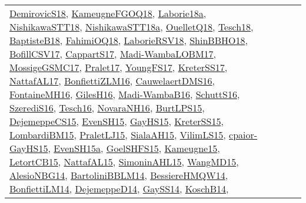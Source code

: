 {\begin{longtable}{lp{3cm}>{\raggedright}p{6cm}>{\raggedright}p{6cm}p{8cm}}
\href{papers/DemirovicS18.pdf}{DemirovicS18}\cite{DemirovicS18}, \href{papers/KameugneFGOQ18.pdf}{KameugneFGOQ18}\cite{KameugneFGOQ18}, \href{papers/Laborie18a.pdf}{Laborie18a}\cite{Laborie18a}, \href{papers/NishikawaSTT18.pdf}{NishikawaSTT18}\cite{NishikawaSTT18}, \href{papers/NishikawaSTT18a.pdf}{NishikawaSTT18a}\cite{NishikawaSTT18a}, \href{papers/OuelletQ18.pdf}{OuelletQ18}\cite{OuelletQ18}, \href{papers/Tesch18.pdf}{Tesch18}\cite{Tesch18}, \href{articles/BaptisteB18.pdf}{BaptisteB18}\cite{BaptisteB18}, \href{articles/FahimiOQ18.pdf}{FahimiOQ18}\cite{FahimiOQ18}, \href{articles/LaborieRSV18.pdf}{LaborieRSV18}\cite{LaborieRSV18}, \href{articles/ShinBBHO18.pdf}{ShinBBHO18}\cite{ShinBBHO18}, \href{papers/BofillCSV17.pdf}{BofillCSV17}\cite{BofillCSV17}, \href{papers/CappartS17.pdf}{CappartS17}\cite{CappartS17}, \href{papers/Madi-WambaLOBM17.pdf}{Madi-WambaLOBM17}\cite{Madi-WambaLOBM17}, \href{papers/MossigeGSMC17.pdf}{MossigeGSMC17}\cite{MossigeGSMC17}, \href{papers/Pralet17.pdf}{Pralet17}\cite{Pralet17}, \href{papers/YoungFS17.pdf}{YoungFS17}\cite{YoungFS17}, \href{articles/KreterSS17.pdf}{KreterSS17}\cite{KreterSS17}, \href{articles/NattafAL17.pdf}{NattafAL17}\cite{NattafAL17}, \href{papers/BonfiettiZLM16.pdf}{BonfiettiZLM16}\cite{BonfiettiZLM16}, \href{papers/CauwelaertDMS16.pdf}{CauwelaertDMS16}\cite{CauwelaertDMS16}, \href{papers/FontaineMH16.pdf}{FontaineMH16}\cite{FontaineMH16}, \href{papers/GilesH16.pdf}{GilesH16}\cite{GilesH16}, \href{papers/Madi-WambaB16.pdf}{Madi-WambaB16}\cite{Madi-WambaB16}, \href{papers/SchuttS16.pdf}{SchuttS16}\cite{SchuttS16}, \href{papers/SzerediS16.pdf}{SzerediS16}\cite{SzerediS16}, \href{papers/Tesch16.pdf}{Tesch16}\cite{Tesch16}, \href{articles/NovaraNH16.pdf}{NovaraNH16}\cite{NovaraNH16}, \href{papers/BurtLPS15.pdf}{BurtLPS15}\cite{BurtLPS15}, \href{papers/DejemeppeCS15.pdf}{DejemeppeCS15}\cite{DejemeppeCS15}, \href{papers/EvenSH15.pdf}{EvenSH15}\cite{EvenSH15}, \href{papers/GayHS15.pdf}{GayHS15}\cite{GayHS15}, \href{papers/KreterSS15.pdf}{KreterSS15}\cite{KreterSS15}, \href{papers/LombardiBM15.pdf}{LombardiBM15}\cite{LombardiBM15}, \href{papers/PraletLJ15.pdf}{PraletLJ15}\cite{PraletLJ15}, \href{papers/SialaAH15.pdf}{SialaAH15}\cite{SialaAH15}, \href{papers/VilimLS15.pdf}{VilimLS15}\cite{VilimLS15}, \href{papers/cpaior-GayHS15.pdf}{cpaior-GayHS15}\cite{cpaior-GayHS15}, \href{articles/EvenSH15a.pdf}{EvenSH15a}\cite{EvenSH15a}, \href{articles/GoelSHFS15.pdf}{GoelSHFS15}\cite{GoelSHFS15}, \href{articles/Kameugne15.pdf}{Kameugne15}\cite{Kameugne15}, \href{articles/LetortCB15.pdf}{LetortCB15}\cite{LetortCB15}, \href{articles/NattafAL15.pdf}{NattafAL15}\cite{NattafAL15}, \href{articles/SimoninAHL15.pdf}{SimoninAHL15}\cite{SimoninAHL15}, \href{articles/WangMD15.pdf}{WangMD15}\cite{WangMD15}, \href{papers/AlesioNBG14.pdf}{AlesioNBG14}\cite{AlesioNBG14}, \href{papers/BartoliniBBLM14.pdf}{BartoliniBBLM14}\cite{BartoliniBBLM14}, \href{papers/BessiereHMQW14.pdf}{BessiereHMQW14}\cite{BessiereHMQW14}, \href{papers/BonfiettiLM14.pdf}{BonfiettiLM14}\cite{BonfiettiLM14}, \href{papers/DejemeppeD14.pdf}{DejemeppeD14}\cite{DejemeppeD14}, \href{papers/GaySS14.pdf}{GaySS14}\cite{GaySS14}, \href{papers/KoschB14.pdf}{KoschB14}\cite{KoschB14}, 
\end{longtable}}
